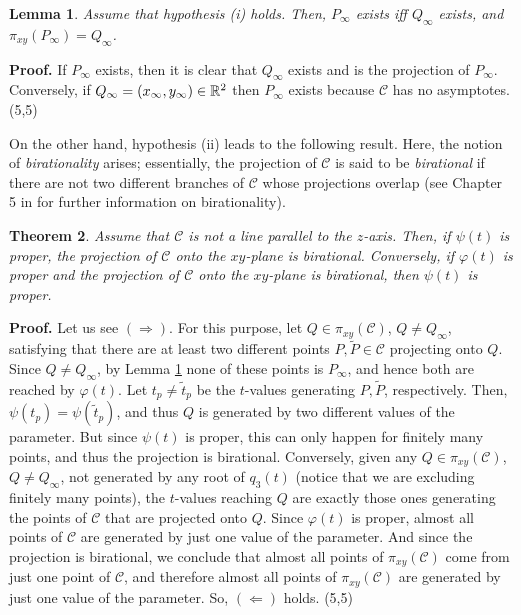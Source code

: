 \documentclass{elsart}
\def\qed{\hfill  \framebox(5,5){}}
\newtheorem{theorem}{{\bf Theorem}}
\newtheorem{lemma}[theorem]{{\bf Lemma}}
\begin{document}
\begin{lemma} \label{inf-points}
Assume that hypothesis (i) holds. Then, $P_{\infty}$ exists iff $Q_{\infty}$ exists, and $\pi_{xy}(P_{\infty})=Q_{\infty}$.
\end{lemma}

{\bf Proof.} If $P_{\infty}$ exists, then it is clear that
$Q_{\infty}$ exists and is the projection of $P_{\infty}$.
Conversely, if $Q_{\infty}=(x_{\infty},y_{\infty})\in {\Bbb R}^2$
then $P_{\infty}$ exists because  ${\mathcal C}$ has no
asymptotes. \qed

On the other hand, hypothesis (ii) leads to the following result. Here, the notion of {\it birationality} arises; essentially, the projection of ${\mathcal C}$ is said to be {\it birational} if there are not two different branches of ${\mathcal C}$ whose projections overlap (see Chapter 5 in \cite{cox-1} for further information on birationality).





\begin{theorem} \label{lem-third-hyp}
Assume that ${\mathcal C}$ is not a line parallel to the $z$-axis. Then, if $\psi(t)$ is proper, the projection of ${\mathcal C}$ onto the $xy$-plane is birational. Conversely, if $\varphi(t)$ is proper and the projection of ${\mathcal C}$ onto the $xy$-plane is birational, then $\psi(t)$ is proper.
\end{theorem}

{\bf Proof.} Let us see $(\Rightarrow)$. For this purpose, let $Q\in \pi_{xy}({\mathcal C})$, $Q\neq Q_{\infty}$, satisfying that there are at least two different points $P,\tilde{P}\in {\mathcal C}$ projecting onto $Q$. Since $Q\neq Q_{\infty}$, by Lemma \ref{inf-points} none of these points is $P_{\infty}$, and hence both are reached by $\varphi(t)$. Let $t_p\neq \tilde{t}_p$ be the $t$-values generating $P,\tilde{P}$, respectively. Then, $\psi(t_p)=\psi(\tilde{t}_p)$, and thus $Q$ is generated by two different values of the parameter. But since $\psi(t)$ is proper, this can only happen for finitely many points, and thus the projection is birational. Conversely, given any $Q\in \pi_{xy}({\mathcal C})$, $Q\neq Q_{\infty}$, not generated by any root of $q_3(t)$ (notice that we are excluding finitely many points), the $t$-values reaching $Q$ are exactly those ones generating the points of ${\mathcal C}$ that are projected onto $Q$. Since $\varphi(t)$ is proper, almost all points of ${\mathcal C}$ are generated by just one value of the parameter. And since the projection is birational, we conclude that almost all points of $\pi_{xy}({\mathcal C})$ come from just one point of ${\mathcal C}$, and therefore almost all points of $\pi_{xy}({\mathcal C})$ are generated by just one value of the parameter. So, $(\Leftarrow)$ holds. \qed
\end{document}
